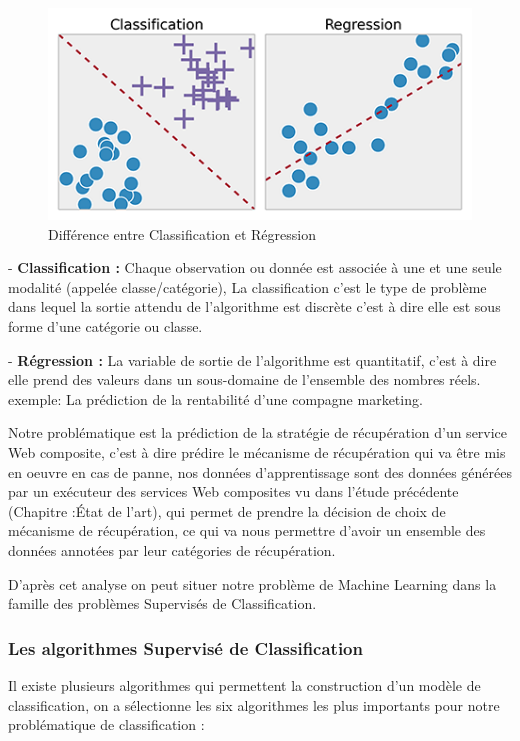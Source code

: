 \begin{figure}[H]
\begin{center}
\includegraphics[width=0.8\linewidth]{images/ClassReg.png}
\end{center}
\caption{Différence entre Classification et Régression}
\label{fig:6}
\end{figure}

- \textbf{Classification :} Chaque observation ou donnée  est associée à une et une seule modalité (appelée classe/catégorie), La classification c'est le type de problème dans lequel la sortie attendu de l'algorithme est discrète c'est à dire elle est sous forme d'une catégorie ou classe.
    
    
- \textbf{Régression :} La variable de sortie de l'algorithme est quantitatif, c'est à dire elle  prend des valeurs dans un sous-domaine de l’ensemble des nombres réels. exemple: La prédiction de la rentabilité d'une compagne marketing. 


Notre problématique est la prédiction de la stratégie de récupération d'un service Web composite, c'est à dire prédire le mécanisme de récupération qui va être mis en oeuvre en cas de panne, nos données d'apprentissage sont des données générées par  un exécuteur des services Web composites vu dans l'étude précédente (Chapitre :État de l'art), qui permet de prendre la décision de choix de mécanisme de récupération, ce qui va nous permettre d'avoir un ensemble des données annotées par leur catégories de récupération. 

D'après cet analyse on peut situer notre problème de Machine Learning dans la famille des problèmes Supervisés de Classification.

\subsubsection{Les algorithmes Supervisé de Classification}

Il existe plusieurs algorithmes qui permettent la construction d'un modèle de classification, on  a sélectionne les six algorithmes les plus importants pour notre problématique de classification : 

